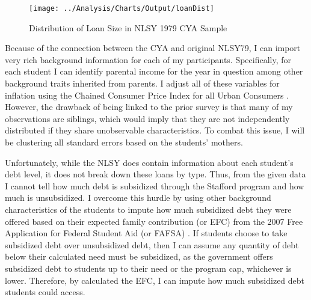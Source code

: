 \documentclass[12pt]{article}
\begin{document}
	\begin{figure}
		\centering
		\caption{Distribution of Loan Size in NLSY 1979 CYA Sample}
		\label{loanDist}
		\texttt{[image: ../Analysis/Charts/Output/loanDist]}
	\end{figure}

	
	Because of the connection between the CYA and original NLSY79, I can import very rich background information for each of my participants. Specifically, for each student I can identify parental income for the year in question among other background traits inherited from parents. I adjust all of these variables for inflation using the Chained Consumer Price Index for all Urban Consumers \parencite{bls2019}. However, the drawback of being linked to the prior survey is that many of my observations are siblings, which would imply that they are not independently distributed if they share unobservable characteristics. To combat this issue, I will be clustering all standard errors based on the students' mothers. 
	
	Unfortunately, while the NLSY does contain information about each student's debt level, it does not break down these loans by type. Thus, from the given data I cannot tell how much debt is subsidized through the Stafford program and how much is unsubsidized. I overcome this hurdle by using other background characteristics of the students to impute how much subsidized debt they were offered based on their expected family contribution (or EFC) from the 2007 Free Application for Federal Student Aid (or FAFSA) \parencite{doe2007}. If students choose to take subsidized debt over unsubsidized debt, then I can assume any quantity of debt below their calculated need must be subsidized, as the government offers subsidized debt to students up to their need or the program cap, whichever is lower. Therefore, by calculated the EFC, I can impute how much subsidized debt students could access.
	
\end{document}
